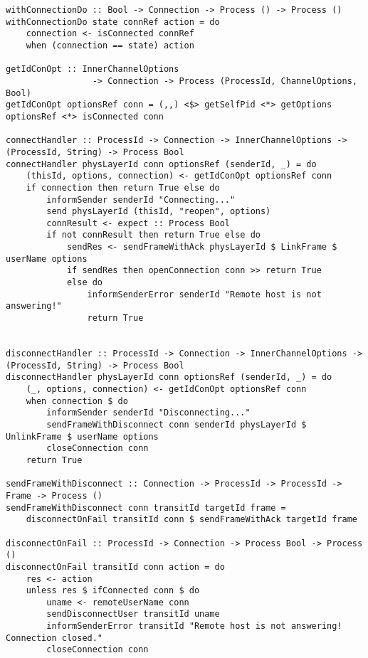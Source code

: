 \documentclass[russian,utf8,simple,emptystyle]{eskdtext}
\begin{document}
\begin{lstlisting}
withConnectionDo :: Bool -> Connection -> Process () -> Process ()
withConnectionDo state connRef action = do 
    connection <- isConnected connRef
    when (connection == state) action

getIdConOpt :: InnerChannelOptions
                 -> Connection -> Process (ProcessId, ChannelOptions, Bool)
getIdConOpt optionsRef conn = (,,) <$> getSelfPid <*> getOptions optionsRef <*> isConnected conn

connectHandler :: ProcessId -> Connection -> InnerChannelOptions -> (ProcessId, String) -> Process Bool
connectHandler physLayerId conn optionsRef (senderId, _) = do
    (thisId, options, connection) <- getIdConOpt optionsRef conn
    if connection then return True else do 
        informSender senderId "Connecting..."
        send physLayerId (thisId, "reopen", options)
        connResult <- expect :: Process Bool
        if not connResult then return True else do 
            sendRes <- sendFrameWithAck physLayerId $ LinkFrame $ userName options
            if sendRes then openConnection conn >> return True
            else do 
                informSenderError senderId "Remote host is not answering!"
                return True


disconnectHandler :: ProcessId -> Connection -> InnerChannelOptions -> (ProcessId, String) -> Process Bool
disconnectHandler physLayerId conn optionsRef (senderId, _) = do
    (_, options, connection) <- getIdConOpt optionsRef conn
    when connection $ do
        informSender senderId "Disconnecting..."
        sendFrameWithDisconnect conn senderId physLayerId $ UnlinkFrame $ userName options
        closeConnection conn
    return True

sendFrameWithDisconnect :: Connection -> ProcessId -> ProcessId -> Frame -> Process ()
sendFrameWithDisconnect conn transitId targetId frame = 
    disconnectOnFail transitId conn $ sendFrameWithAck targetId frame

disconnectOnFail :: ProcessId -> Connection -> Process Bool -> Process ()
disconnectOnFail transitId conn action = do 
    res <- action 
    unless res $ ifConnected conn $ do 
        uname <- remoteUserName conn
        sendDisconnectUser transitId uname
        informSenderError transitId "Remote host is not answering! Connection closed."
        closeConnection conn
\end{lstlisting}
\end{document}
